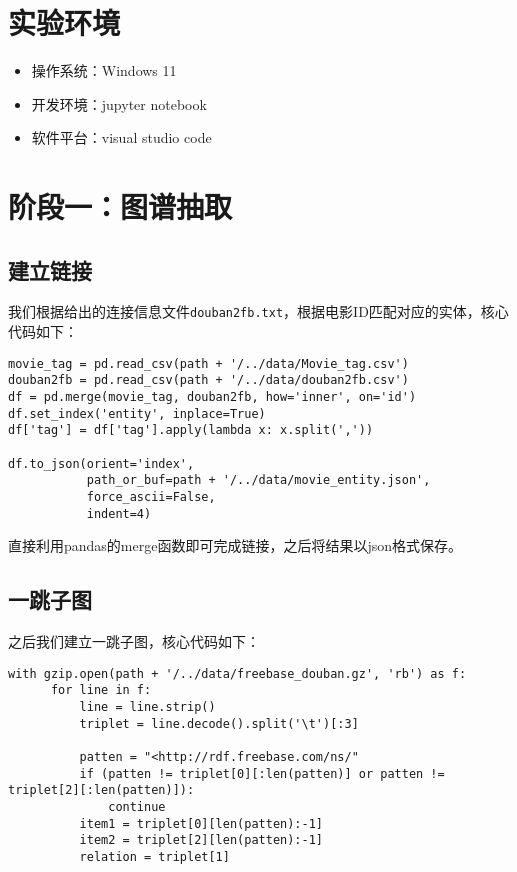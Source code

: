 \documentclass{ctexart}
\begin{document}
\begin{sloppypar}
\section{实验环境}

\begin{itemize}
      \item 操作系统：Windows 11
      \item 开发环境：jupyter notebook
      \item 软件平台：visual studio code
\end{itemize}

\section{阶段一：图谱抽取}
\subsection{建立链接}
我们根据给出的连接信息文件\texttt{douban2fb.txt}，根据电影ID匹配对应的实体，核心代码如下：

\begin{lstlisting}[style=Python]
movie_tag = pd.read_csv(path + '/../data/Movie_tag.csv')
douban2fb = pd.read_csv(path + '/../data/douban2fb.csv')
df = pd.merge(movie_tag, douban2fb, how='inner', on='id')
df.set_index('entity', inplace=True)
df['tag'] = df['tag'].apply(lambda x: x.split(','))

df.to_json(orient='index',
           path_or_buf=path + '/../data/movie_entity.json',
           force_ascii=False,
           indent=4)
\end{lstlisting}

直接利用pandas的merge函数即可完成链接，之后将结果以json格式保存。

\subsection{一跳子图}
之后我们建立一跳子图，核心代码如下：

\begin{lstlisting}[style=Python]
with gzip.open(path + '/../data/freebase_douban.gz', 'rb') as f:
      for line in f:
          line = line.strip()
          triplet = line.decode().split('\t')[:3]
  
          patten = "<http://rdf.freebase.com/ns/"
          if (patten != triplet[0][:len(patten)] or patten != triplet[2][:len(patten)]):
              continue
          item1 = triplet[0][len(patten):-1]
          item2 = triplet[2][len(patten):-1]
          relation = triplet[1]
  

\end{lstlisting}
\end{sloppypar}
\end{document}
